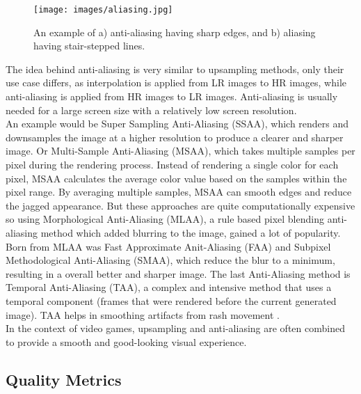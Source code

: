 \documentclass[letterpaper, 10 pt, conference]{ieeeconf}  %
\begin{document}
\begin{figure}[!ht]
        \caption{An example of a) anti-aliasing having sharp edges, and b) aliasing having stair-stepped lines.}
        \centering
        \texttt{[image: images/aliasing.jpg]}
        \label{fig:antiAliasing}
    \end{figure}

The idea behind anti-aliasing is very similar to upsampling methods, only their use case differs, as interpolation is applied from LR images to HR images, while anti-aliasing is applied from HR images to LR images.
Anti-aliasing is usually needed for a large screen size with a relatively low screen resolution.\\
An example would be Super Sampling Anti-Aliasing (SSAA), which renders and downsamples the image at a higher resolution to produce a clearer and sharper image. 
Or Multi-Sample Anti-Aliasing (MSAA), which takes multiple samples per pixel during the rendering process. 
Instead of rendering a single color for each pixel, MSAA calculates the average color value based on the samples within the pixel range. 
By averaging multiple samples, MSAA can smooth edges and reduce the jagged appearance.
But these approaches are quite computationally expensive so using Morphological Anti-Aliasing (MLAA), a rule based pixel blending anti-aliasing method which added blurring to the image, gained a lot of popularity. 
Born from MLAA was Fast Approximate Anit-Aliasing (FAA) and Subpixel Methodological Anti-Aliasing (SMAA), which reduce the blur to a minimum, resulting in a overall better and sharper image.
The last Anti-Aliasing method is Temporal Anti-Aliasing (TAA), a complex and intensive method that uses a temporal component (frames that were rendered before the current generated image). 
TAA helps in smoothing artifacts from rash movement \cite{antialiasing_types} \cite{gu2022super} \cite{stuttgart_boy}.\\
In the context of video games, upsampling and anti-aliasing are often combined to provide a smooth and good-looking visual experience.

\subsection{Quality Metrics}
\end{document}
